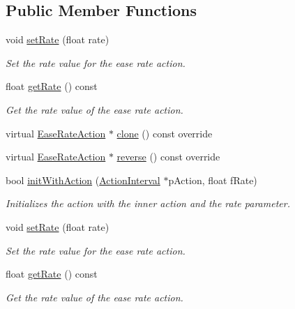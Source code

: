 \subsection*{Public Member Functions}
\begin{DoxyCompactItemize}
\item 
void \hyperlink{classEaseRateAction_add78bf76aa60e1e4b192d47c7b81b510}{set\+Rate} (float rate)
\begin{DoxyCompactList}\small\item\em Set the rate value for the ease rate action. \end{DoxyCompactList}\item 
float \hyperlink{classEaseRateAction_ab1499ad93170ecc10b44ad02888c889d}{get\+Rate} () const
\begin{DoxyCompactList}\small\item\em Get the rate value of the ease rate action. \end{DoxyCompactList}\item 
virtual \hyperlink{classEaseRateAction}{Ease\+Rate\+Action} $\ast$ \hyperlink{classEaseRateAction_a50323a94f7587203d7b02bb66fe2e67e}{clone} () const override
\item 
virtual \hyperlink{classEaseRateAction}{Ease\+Rate\+Action} $\ast$ \hyperlink{classEaseRateAction_acd2b87a3358e01fa74a726634dcd41fb}{reverse} () const override
\item 
bool \hyperlink{classEaseRateAction_aab967ce600eedd8b912f6b359a44cd59}{init\+With\+Action} (\hyperlink{classActionInterval}{Action\+Interval} $\ast$p\+Action, float f\+Rate)
\begin{DoxyCompactList}\small\item\em Initializes the action with the inner action and the rate parameter. \end{DoxyCompactList}\item 
void \hyperlink{classEaseRateAction_add78bf76aa60e1e4b192d47c7b81b510}{set\+Rate} (float rate)
\begin{DoxyCompactList}\small\item\em Set the rate value for the ease rate action. \end{DoxyCompactList}\item 
float \hyperlink{classEaseRateAction_ab1499ad93170ecc10b44ad02888c889d}{get\+Rate} () const
\begin{DoxyCompactList}\small\item\em Get the rate value of the ease rate action. \end{DoxyCompactList}\end{DoxyCompactItemize}
